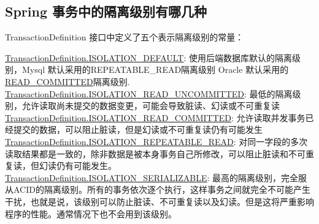 \documentclass[../../../interview-questions.tex]{subfiles}
\begin{document}
\subsection{Spring 事务中的隔离级别有哪几种}

TransactionDefinition 接口中定义了五个表示隔离级别的常量：

\url{TransactionDefinition.ISOLATION\_DEFAULT}:  使用后端数据库默认的隔离级别，Mysql 默认采用的REPEATABLE\_READ隔离级别 Oracle 默认采用的 \url{READ\_COMMITTED}隔离级别.
\url{TransactionDefinition.ISOLATION\_READ\_UNCOMMITTED}: 最低的隔离级别，允许读取尚未提交的数据变更，可能会导致脏读、幻读或不可重复读
\url{TransactionDefinition.ISOLATION\_READ\_COMMITTED}:   允许读取并发事务已经提交的数据，可以阻止脏读，但是幻读或不可重复读仍有可能发生
\url{TransactionDefinition.ISOLATION\_REPEATABLE\_READ}:  对同一字段的多次读取结果都是一致的，除非数据是被本身事务自己所修改，可以阻止脏读和不可重复读，但幻读仍有可能发生。
\url{TransactionDefinition.ISOLATION\_SERIALIZABLE}:   最高的隔离级别，完全服从ACID的隔离级别。所有的事务依次逐个执行，这样事务之间就完全不可能产生干扰，也就是说，该级别可以防止脏读、不可重复读以及幻读。但是这将严重影响程序的性能。通常情况下也不会用到该级别。
\end{document}
